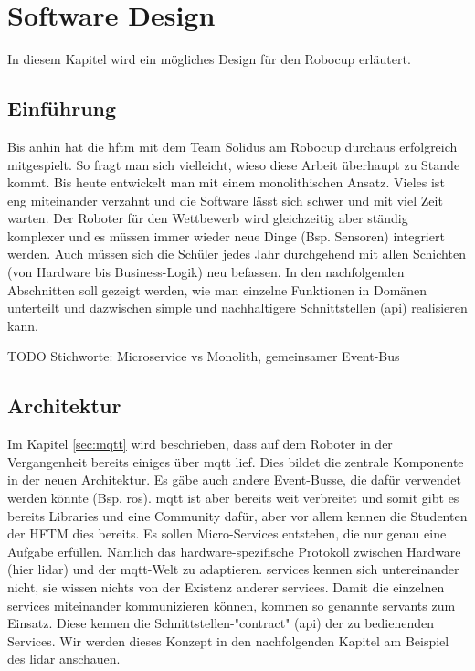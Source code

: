 \chapter{Software Design}
In diesem Kapitel wird ein mögliches Design für den Robocup erläutert.
\section{Einführung}
Bis anhin hat die \acrshort{hftm} mit dem Team Solidus am Robocup durchaus erfolgreich mitgespielt. So fragt man sich vielleicht, wieso diese Arbeit überhaupt zu Stande kommt. Bis heute entwickelt man mit einem monolithischen Ansatz. Vieles ist eng miteinander verzahnt und die Software lässt sich schwer und mit viel Zeit warten. Der Roboter für den Wettbewerb wird gleichzeitig aber ständig komplexer und es müssen immer wieder neue Dinge (Bsp. Sensoren) integriert werden. Auch müssen sich die Schüler jedes Jahr durchgehend mit allen Schichten (von Hardware bis Business-Logik) neu befassen. In den nachfolgenden Abschnitten soll gezeigt werden, wie man einzelne Funktionen in Domänen unterteilt und dazwischen simple und nachhaltigere Schnittstellen (\acrshort{api}) realisieren kann.



\bigskip
TODO
Stichworte: Microservice vs Monolith, gemeinsamer Event-Bus

\section{Architektur}
Im Kapitel \ref{sec:mqtt} wird beschrieben, dass auf dem Roboter in der Vergangenheit bereits einiges über \acrshort{mqtt} lief. Dies bildet die zentrale Komponente in der neuen Architektur. Es gäbe auch andere Event-Busse, die dafür verwendet werden könnte (Bsp. \acrshort{ros}). \acrshort{mqtt} ist aber bereits weit verbreitet und somit gibt es bereits Libraries und eine Community dafür, aber vor allem kennen die Studenten der HFTM dies bereits. Es sollen Micro-Services entstehen, die nur genau eine Aufgabe erfüllen. Nämlich das hardware-spezifische Protokoll zwischen Hardware (hier \acrshort{lidar}) und der \acrshort{mqtt}-Welt zu adaptieren. \Glspl{service} kennen sich untereinander nicht, sie wissen nichts von der Existenz anderer \glspl{service}. Damit die einzelnen \Glspl{service} miteinander kommunizieren können, kommen so genannte \Glspl{servant} zum Einsatz. Diese kennen die Schnittstellen-"\gls{contract}" (\acrshort{api}) der zu bedienenden Services. Wir werden dieses Konzept in den nachfolgenden Kapitel am Beispiel des \acrshort{lidar} anschauen.

